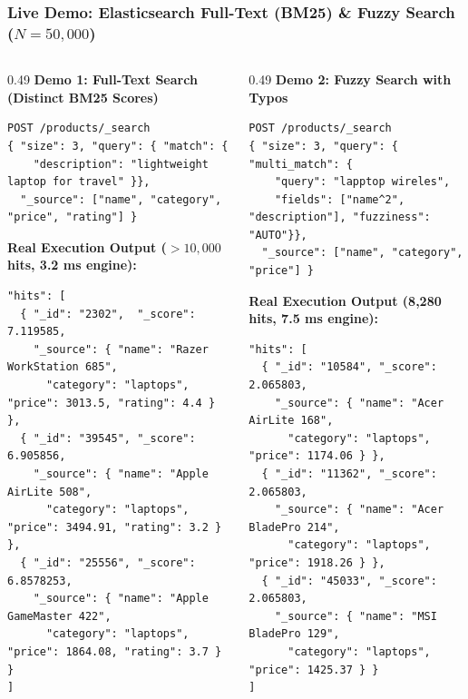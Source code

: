 \documentclass[aspectratio=169]{beamer}
\begin{document}
\begin{frame}[fragile]
\frametitle{Live Demo: Elasticsearch Full-Text (BM25) \& Fuzzy Search ($N=50,000$)}
\begin{columns}[T]
\begin{column}{0.49\textwidth}
\textbf{\tiny Demo 1: Full-Text Search (Distinct BM25 Scores)}
\begin{lstlisting}
POST /products/_search
{ "size": 3, "query": { "match": {
    "description": "lightweight laptop for travel" }},
  "_source": ["name", "category", "price", "rating"] }
\end{lstlisting}
\textbf{\tiny Real Execution Output ($>10,000$ hits, 3.2 ms engine):}
\begin{lstlisting}
"hits": [
  { "_id": "2302",  "_score": 7.119585,
    "_source": { "name": "Razer WorkStation 685",
      "category": "laptops", "price": 3013.5, "rating": 4.4 } },
  { "_id": "39545", "_score": 6.905856,
    "_source": { "name": "Apple AirLite 508",
      "category": "laptops", "price": 3494.91, "rating": 3.2 } },
  { "_id": "25556", "_score": 6.8578253,
    "_source": { "name": "Apple GameMaster 422",
      "category": "laptops", "price": 1864.08, "rating": 3.7 } }
]
\end{lstlisting}
\end{column}
\begin{column}{0.49\textwidth}
\textbf{\tiny Demo 2: Fuzzy Search with Typos}
\begin{lstlisting}
POST /products/_search
{ "size": 3, "query": { "multi_match": {
    "query": "lapptop wireles",
    "fields": ["name^2", "description"], "fuzziness": "AUTO"}},
  "_source": ["name", "category", "price"] }
\end{lstlisting}
\textbf{\tiny Real Execution Output (8,280 hits, 7.5 ms engine):}
\begin{lstlisting}
"hits": [
  { "_id": "10584", "_score": 2.065803,
    "_source": { "name": "Acer AirLite 168",
      "category": "laptops", "price": 1174.06 } },
  { "_id": "11362", "_score": 2.065803,
    "_source": { "name": "Acer BladePro 214",
      "category": "laptops", "price": 1918.26 } },
  { "_id": "45033", "_score": 2.065803,
    "_source": { "name": "MSI BladePro 129",
      "category": "laptops", "price": 1425.37 } }
]
\end{lstlisting}
\end{column}
\end{columns}
\end{frame}
\end{document}

